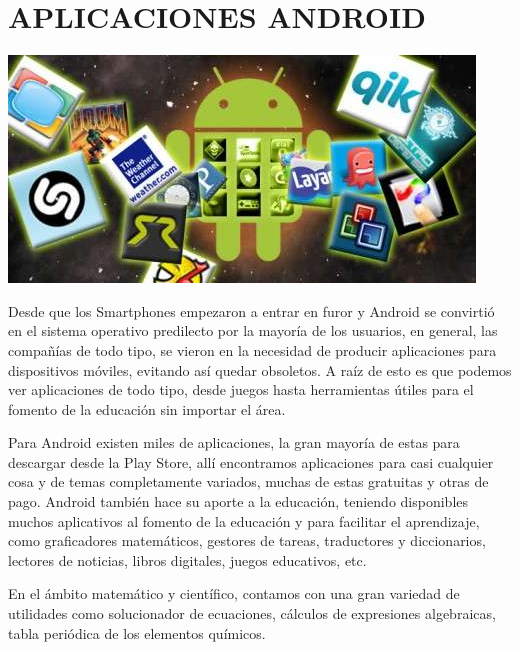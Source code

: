 \section*{APLICACIONES ANDROID}
\includegraphics[scale=0.5]{img/cp05/img0505.png}

Desde que los Smartphones empezaron a entrar en furor y Android se convirtió en el sistema operativo predilecto por la mayoría de los usuarios, en general, las compañías de todo 
tipo, se vieron en la necesidad de producir aplicaciones para dispositivos móviles, evitando así quedar obsoletos. A raíz de esto es que podemos ver aplicaciones de todo tipo, 
desde juegos hasta herramientas útiles para el fomento de la educación sin importar el área.
 
Para Android existen miles de aplicaciones, la gran mayoría de estas para descargar desde la Play Store, allí encontramos aplicaciones para casi cualquier cosa y de temas 
completamente variados, muchas de estas gratuitas y otras de pago. Android también hace su aporte a la educación, teniendo disponibles muchos aplicativos al fomento de la 
educación y para facilitar el aprendizaje, como graficadores matemáticos, gestores de tareas, traductores y diccionarios, lectores de noticias, libros digitales, juegos 
educativos, etc.
 
En el ámbito matemático y científico, contamos con una gran variedad de utilidades como solucionador de ecuaciones, cálculos de expresiones algebraicas, tabla periódica de los 
elementos químicos.
 
